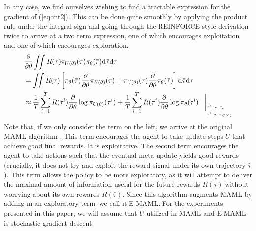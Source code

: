 \documentclass{article} %
\begin{document}


In any case, we find ourselves wishing to find a tractable expression for the gradient of (\ref{eq:int2}). This can be done quite smoothly by applying the product rule under the integral sign and going through the REINFORCE style derivation twice to arrive at a two term expression, one of which encourages exploitation and one of which encourages exploration.
\begin{align}
& \frac{\partial}{\partial \theta} \iint R(\tau) \pi_{U(\theta)} (\tau) \pi_\theta (\bar{\tau})\mathrm{d}\bar{\tau}\mathrm{d}\tau \nonumber\\
&= \iint R(\tau) \left[ \pi_\theta(\bar{\tau}) \frac{\partial}{\partial \theta} \pi_{U(\theta)} (\tau) + \pi_{U(\theta)}(\tau) \frac{\partial}{\partial \theta} \pi_\theta (\bar{\tau}) \right]\mathrm{d}\bar{\tau}\mathrm{d}\tau \nonumber\\
& \approx \frac{1}{T} \sum_{i=1}^T R(\tau^{i}) \frac{\partial}{\partial \theta} \log \pi_{U(\theta)} (\tau^i) + \frac{1}{T} \sum_{i=1}^T R(\tau^{i}) \frac{\partial}{\partial \theta} \log \pi_{\theta} (\bar{\tau}^i) \hspace{3mm} \bigg\vert_{
\tiny
\begin{aligned}
\bar{\tau}^i &\sim \pi_\theta\\[-0.5em]
      \tau^i &\sim \pi_{U(\theta)}%
\end{aligned}
}%
\end{align}
Note that, if we only consider the term on the left, we arrive at the original MAML algorithm \cite{maml}. This term encourages the agent to take update steps $U$ that achieve good final rewards. It is exploitative. The second term encourages the agent to take actions such that the eventual meta-update yields good rewards (crucially, it does not try and exploit the reward signal under its own trajectory $\bar{\tau}$). This term allows the policy to be more exploratory, as it will attempt to deliver the maximal amount of information useful for the future rewards $R(\tau)$ without worrying about its own rewards $R(\bar{\tau})$. Since this algorithm augments MAML by adding in an exploratory term, we call it E-MAML. For the experiments presented in this paper, we will assume that $U$ utilized in MAML and E-MAML is stochastic gradient descent.   
\end{document}
